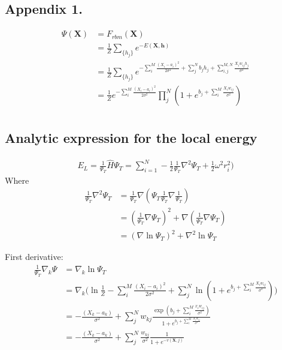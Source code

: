 \documentclass[%
oneside,                 %
final,                   %
10pt]{article}
\begin{document}
\begin{appendices}
\section{Appendix 1.} \label{APP_1}
\begin{align*}
\Psi (\mathbf{X}) &= F_{rbm}(\mathbf{X}) \\
&= \frac{1}{Z}\sum_{\{h_j\}} e^{-E(\mathbf{X}, \mathbf{h})} \\
&= \frac{1}{Z} \sum_{\{h_j\}} e^{-\sum_i^M \frac{(X_i - a_i)^2}{2\sigma^2} + \sum_j^N b_j h_j + \sum_{i,j}^{M,N} \frac{X_i w_{ij} h_j}{\sigma^2}} \\
&= \frac{1}{Z} e^{-\sum_i^M \frac{(X_i - a_i)^2}{2\sigma^2}} \prod_j^N (1 + e^{b_j + \sum_i^M \frac{X_i w_{ij}}{\sigma^2}}) \\
\end{align*}
\subsection{Analytic expression for the local energy}
\begin{equation}
\begin{aligned}
E_L=\frac{1}{\Psi_T}\hat H \Psi_T = \sum_{i=1}^N -\frac{1}{2} \frac{1}{\Psi_T} \nabla^2 \Psi_T + \frac{1}{2}\omega^2r_i^2)
\end{aligned}
\label{eq:Appendix_localenergy}
\end{equation}
Where
\begin{equation}
\begin{aligned}
\frac{1}{\Psi_T}\nabla^2 \Psi_T &=  \frac{1}{\Psi_T}\nabla (\Psi _T \frac{1}{\Psi_T} \nabla \frac{1}{\Psi_T})\\
&= (\frac{1}{\Psi_T} \nabla \Psi_T) ^2 + \nabla (\frac{1}{\Psi_T}\nabla \Psi_T)\\ 
&= (\nabla \ln \Psi_T)^2 + \nabla^2 \ln \Psi_T
\end{aligned}
\label{eq:Appendix_rewrite}
\end{equation}

First derivative:
\begin{equation}
\begin{aligned}
\frac{1}{\Psi_T} \nabla_k \Psi &= \nabla_k  \ln \Psi_T \\
&= \nabla_k  \big( \ln \frac{1}{Z}  -\sum_i^M \frac{(X_i - a_i)^2}{2\sigma^2} +  \sum_j^N \ln (1 + e^{ b_j + \sum_i^M \frac{X_i w_{ij}}{\sigma^2}}) \big) \\
&= 
  - \frac{(X_k - a_k)}{\sigma^2} + \sum_{j}^N w_{kj}\frac{\exp (b_j + \sum_i^M \frac{x_i w_{ij}}{\sigma^2})}{1 + e^{ b_j + \sum_i^M \frac{X_i w_{ij}}{\sigma^2}}}  \\
&= - \frac{(X_k - a_k)}{\sigma^2} + \sum_{j}^N \frac{w_{kj}}{\sigma^2}\frac{1}{1 + e^{-v(\bm X,j)}}
\end{aligned}
\label{eq:Appendix_1derivative}
\end{equation}


\end{appendices}
\end{document}
